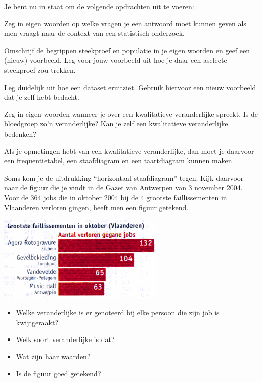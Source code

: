 \documentclass[12pt,twoside]{article}
\begin{document}
Je bent nu in staat om de volgende opdrachten uit te voeren:

\begin{oefening}
Zeg in eigen woorden op welke vragen je een antwoord moet kunnen geven als men vraagt
naar de context van een statistisch onderzoek.
\end{oefening}

\begin{oefening}
Omschrijf de begrippen steekproef en populatie in je eigen woorden en geef een (nieuw)
voorbeeld. Leg voor jouw voorbeeld uit hoe je daar een aselecte steekproef zou
trekken.
\end{oefening}

\begin{oefening}
Leg duidelijk uit hoe een dataset eruitziet. Gebruik hiervoor een nieuw voorbeeld dat je zelf
hebt bedacht.
\end{oefening}

\begin{oefening}
Zeg in eigen woorden wanneer je over een kwalitatieve veranderlijke spreekt. Is de bloedgroep zo’n veranderlijke? Kan je zelf een kwalitatieve veranderlijke bedenken?
\end{oefening}


Als je opmetingen hebt van een kwalitatieve veranderlijke, dan moet je daarvoor
een frequentietabel, een staafdiagram en een taartdiagram kunnen maken.

Soms kom je de uitdrukking “horizontaal staafdiagram” tegen. Kijk daarvoor naar de figuur
die je vindt in de Gazet van Antwerpen van 3 november 2004. Voor de 364 jobs die in
oktober 2004 bij de 4 grootste faillissementen in Vlaanderen verloren gingen, heeft men een
figuur getekend.

\begin{center}
  \includegraphics[width=0.6\textwidth]{horizontaal_staafdiagram-faillissementen}
\end{center}


\begin{oefening}
\begin{itemize}
\item Welke veranderlijke is er genoteerd bij elke persoon die zijn job is kwijtgeraakt?
\item Welk soort veranderlijke is dat?
\item Wat zijn haar waarden?
\item Is de figuur goed getekend?
\end{itemize}
\end{oefening}
\end{document}
